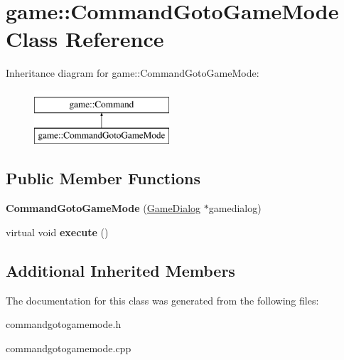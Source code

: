 \hypertarget{classgame_1_1CommandGotoGameMode}{}\section{game\+:\+:Command\+Goto\+Game\+Mode Class Reference}
\label{classgame_1_1CommandGotoGameMode}
Inheritance diagram for game\+:\+:Command\+Goto\+Game\+Mode\+:\begin{figure}[H]
\begin{center}
\leavevmode
\includegraphics[height=2.000000cm]{classgame_1_1CommandGotoGameMode}
\end{center}
\end{figure}
\subsection*{Public Member Functions}
\begin{DoxyCompactItemize}
\item 
\mbox{\label{classgame_1_1CommandGotoGameMode_a561a417ea502150f313caefe7a2fcfdd}} 
{\bfseries Command\+Goto\+Game\+Mode} (\hyperlink{classgame_1_1GameDialog}{Game\+Dialog} $\ast$gamedialog)
\item 
\mbox{\label{classgame_1_1CommandGotoGameMode_a19a17714630bc986ebaa713ffd64224f}} 
virtual void {\bfseries execute} ()
\end{DoxyCompactItemize}
\subsection*{Additional Inherited Members}


The documentation for this class was generated from the following files\+:\begin{DoxyCompactItemize}
\item 
commandgotogamemode.\+h\item 
commandgotogamemode.\+cpp\end{DoxyCompactItemize}
